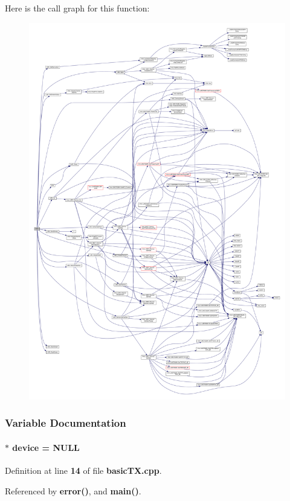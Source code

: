 Here is the call graph for this function\+:
\nopagebreak
\begin{figure}[H]
\begin{center}
\leavevmode
\includegraphics[width=350pt]{d2/db0/basicTX_8cpp_a3c04138a5bfe5d72780bb7e82a18e627_cgraph}
\end{center}
\end{figure}




\subsubsection{Variable Documentation}
\paragraph[{device}]{$\ast$ device = N\+U\+LL}\label{basicTX_8cpp_a6bc15a746822d9c4a5621463acd4ca25}


Definition at line {\bf 14} of file {\bf basic\+T\+X.\+cpp}.



Referenced by {\bf error()}, and {\bf main()}.


